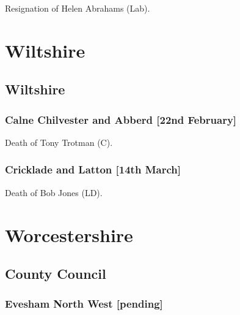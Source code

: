 \documentclass[a4paper,openany]{book}
\begin{document}
\begin{resultsiii}

Resignation of Helen Abrahams (Lab).

\section{Wiltshire}

\subsection*{Wiltshire}

\subsubsection*{Calne Chilvester and Abberd \hspace*{\fill}\nolinebreak[1]%
	\enspace\hspace*{\fill}
	[22nd February]}


Death of Tony Trotman (C).

\subsubsection*{Cricklade and Latton \hspace*{\fill}\nolinebreak[1]%
	\enspace\hspace*{\fill}
	[14th March]}


Death of Bob Jones (LD).

\section{Worcestershire}

\subsection*{County Council}

\subsubsection*{Evesham North West \hspace*{\fill}\nolinebreak[1]%
	\enspace\hspace*{\fill}
	[pending]}


\end{resultsiii}
\end{document}
